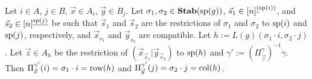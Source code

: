 \documentclass[../paper.tex]{subfiles}
\begin{document}
\begin{lem}
  \label{lem:defining-h-from-IJ}
  Let $i \in A$, $j \in B$, $\vec{x} \in A_i$, $\vec{y} \in B_j$. Let $\sigma_1,
  \sigma_2 \in \text{\textbf{Stab}} (\text{sp} (g))$, $\vec{s}_1 \in [n]^{\underline(\text{sp}(i))}$, and
  $\vec{s}_2 \in [n]^{\underline{\text{sp}(j)}}$ be such that $\vec{s}_1$ and
  $\vec{s}_2$ are the restrictions of $\sigma_1$ and $\sigma_2$ to $\text{sp}(i)$
  and $\text{sp}(j)$, respectively, and $\vec{x}_{s_1}$ and $\vec{y}_{s_2}$ are
  compatible. Let $h := L(g)(\sigma_1 \cdot i, \sigma_2 \cdot j)$. Let $\vec{z}
  \in A_h$ be the restriction of $(\vec{x}_{\vec{s}_1} \vert
  \vec{y}_{\vec{s}_2})$ to $\text{sp}(h)$ and $\gamma' :=
  (\Pi^{\gamma}_{\vec{z}})^{-1} \gamma$. Then $\Pi^{\gamma'}_{\vec{x}}(i) =
  \sigma_1 \cdot i = \text{row} (h)$ and $\Pi^{\gamma'}_{\vec{y}}(j) = \sigma_2 \cdot
  j = \text{col} (h)$.
\end{lem}
\end{document}
